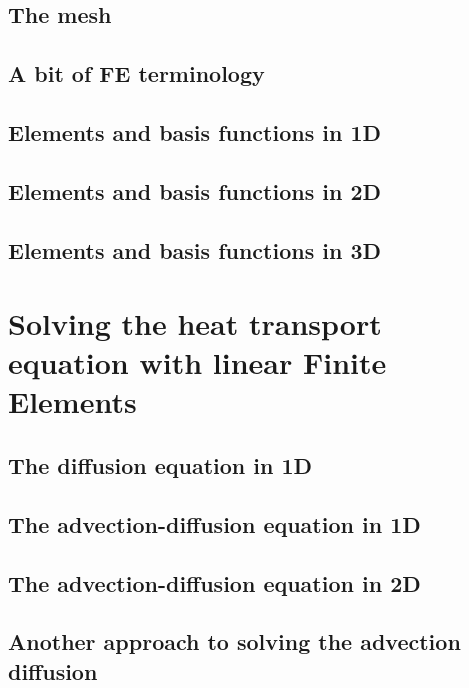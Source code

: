 \documentclass[a4paper]{article}
\begin{document}
\subsection{The mesh}
\subsection{A bit of FE terminology}  %
\subsection{Elements and basis functions in 1D}\label{sec:elts1D}  %
\subsection{Elements and basis functions in 2D}\label{sec:shpfct2d}  %
\subsection{Elements and basis functions in 3D}  %

\newpage 
\section{Solving the heat transport equation with linear Finite Elements} %
\subsection{The diffusion equation in 1D} \label{sec:diff1D}  %
\subsection{The advection-diffusion equation in 1D} \label{sec:advec-diff1D} %
\subsection{The advection-diffusion equation in 2D} \label{ss:hte_fem} %
\subsection{Another approach to solving the advection diffusion} 
\end{document}
